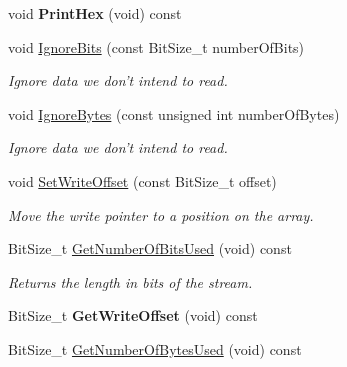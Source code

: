 \begin{DoxyCompactItemize}
\item 
\hypertarget{class_rak_net_1_1_bit_stream_aaf4603e961d604ea6bfc842981643acc}{void {\bfseries Print\-Hex} (void) const }\label{class_rak_net_1_1_bit_stream_aaf4603e961d604ea6bfc842981643acc}

\item 
void \hyperlink{class_rak_net_1_1_bit_stream_a1952b3b3007b120fdd143f87311a98a2}{Ignore\-Bits} (const Bit\-Size\-\_\-t number\-Of\-Bits)
\begin{DoxyCompactList}\small\item\em Ignore data we don't intend to read. \end{DoxyCompactList}\item 
void \hyperlink{class_rak_net_1_1_bit_stream_a26310ba75436c24a1272e65da6a90a1e}{Ignore\-Bytes} (const unsigned int number\-Of\-Bytes)
\begin{DoxyCompactList}\small\item\em Ignore data we don't intend to read. \end{DoxyCompactList}\item 
void \hyperlink{class_rak_net_1_1_bit_stream_aa56ebc6a1381369ddc2a6d7821512d7e}{Set\-Write\-Offset} (const Bit\-Size\-\_\-t offset)
\begin{DoxyCompactList}\small\item\em Move the write pointer to a position on the array. \end{DoxyCompactList}\item 
\hypertarget{class_rak_net_1_1_bit_stream_a403d4d6ada2fd98bc78943124fc1276a}{Bit\-Size\-\_\-t \hyperlink{class_rak_net_1_1_bit_stream_a403d4d6ada2fd98bc78943124fc1276a}{Get\-Number\-Of\-Bits\-Used} (void) const }\label{class_rak_net_1_1_bit_stream_a403d4d6ada2fd98bc78943124fc1276a}

\begin{DoxyCompactList}\small\item\em Returns the length in bits of the stream. \end{DoxyCompactList}\item 
\hypertarget{class_rak_net_1_1_bit_stream_ad4eb7d300df460b66060661a6e776d43}{Bit\-Size\-\_\-t {\bfseries Get\-Write\-Offset} (void) const }\label{class_rak_net_1_1_bit_stream_ad4eb7d300df460b66060661a6e776d43}

\item 
\hypertarget{class_rak_net_1_1_bit_stream_a98478b4da2e29d5923c0ae80bda76f97}{Bit\-Size\-\_\-t \hyperlink{class_rak_net_1_1_bit_stream_a98478b4da2e29d5923c0ae80bda76f97}{Get\-Number\-Of\-Bytes\-Used} (void) const }\label{class_rak_net_1_1_bit_stream_a98478b4da2e29d5923c0ae80bda76f97}


\end{DoxyCompactItemize}
